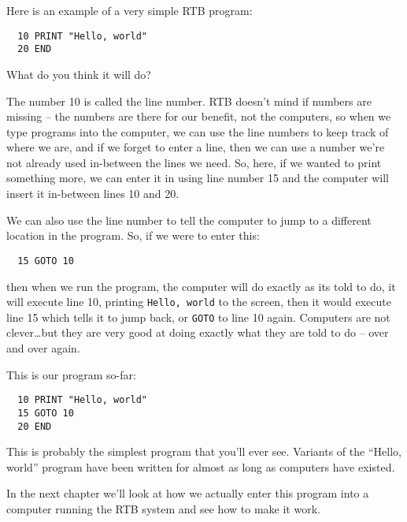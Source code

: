 {\samepage \noindent {}
Here is an example of a very simple RTB program:
\begin{verbatim}
  10 PRINT "Hello, world"
  20 END
\end{verbatim}
What do you think it will do?}

The number 10 is called the line number. RTB doesn't
mind if numbers are missing -- the numbers are there for our benefit,
not the computers, so when we type programs into the computer, we can
use the line numbers to keep track of where we are, and if we forget to
enter a line, then we can use a number we're not already used in-between
the lines we need. So, here, if we wanted to print something more, we
can enter it in using line number 15 and the computer will insert it
in-between lines 10 and 20.

We can also use the line number to tell the computer to jump to a
different location in the program. So, if we were to enter this:
\begin{verbatim}
  15 GOTO 10
\end{verbatim}
then when we run the program, the computer will do exactly as its told to
do, it will execute line 10, printing {\tt Hello, world} to the screen,
then it would execute line 15 which tells it to jump back, or {\tt GOTO} to line 10
again. Computers are not clever\dots but they are very good at doing
exactly what they are told to do -- over and over again.

\noindent
This is our program so-far:
\begin{verbatim}
  10 PRINT "Hello, world"
  15 GOTO 10
  20 END
\end{verbatim}

This is probably the simplest program that you'll ever see. Variants
of the ``Hello, world'' program have been written for almost as long as
computers have existed.

In the next chapter we'll look at how we actually enter this program into
a computer running the RTB system and see how to make it work.
